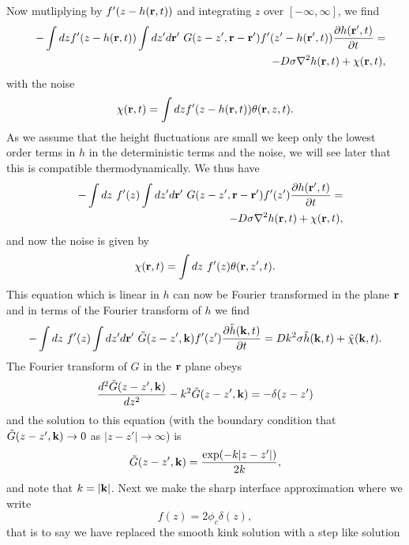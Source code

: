 \documentclass[11pt]{report}
\begin{document}
Now mutliplying by $f'(z-h({\bf r},t))$ and integrating $z$ over $[-\infty,\infty]$, we find
\begin{eqnarray}
&&-\int dz f'(z-h({\bf r},t))\int dz'd{\bf r}'\  G(z-z',{\bf r}-{\bf r}') f'(z'-h({\bf r}',t))\frac{\partial h({\bf r}',t)}{\partial t} = \\
&&-D\sigma \nabla^2 h({\bf r},t) + \chi({\bf r},t),
\end{eqnarray}
with the noise
\begin{equation}
\chi({\bf r},t)= \int dz f'(z-h({\bf r},t)) \theta({\bf r},z,t).
\end{equation}
As we assume that the height fluctuations are small we keep only the lowest order terms in $h$ in the deterministic terms and the noise, we will see later that this is compatible thermodynamically. We thus have
\begin{eqnarray}
&&-\int dz \ f'(z)\int dz'd{\bf r}'\  G(z-z',{\bf r}-{\bf r}') f'(z')\frac{\partial h({\bf r}',t)}{\partial t} = \\
&&-D\sigma \nabla^2 h({\bf r},t) + \chi({\bf r},t),
\end{eqnarray}
and now  the noise is given by
\begin{equation}
\chi({\bf r},t)= \int dz\  f'(z) \theta({\bf r},z',t).
\end{equation}
This equation which is linear in $h$ can now be Fourier transformed in the plane ${\bf r}$ and in terms of the Fourier transform of $h$ we find
\begin{equation}
-\int dz \ f'(z)\int dz'd{\bf r}'\ \tilde G(z-z',{\bf k}) f'(z')\frac{\partial\tilde h({\bf k},t)}{\partial t} = 
Dk^2\sigma \tilde h({\bf k},t) + \tilde \chi({\bf k},t).\label{bstep}
\end{equation}
The Fourier transform of $G$ in the ${\bf r}$ plane obeys
\begin{equation}
\frac{d^2 \tilde G(z-z',{\bf k} )}{dz^2}-k^2 \tilde G(z-z',{\bf k} )=-\delta(z-z')
\end{equation}
and the solution to this equation (with the boundary condition that $\tilde G(z-z',{\bf k} )\to 0$ as $|z-z'|\to\infty$)  is
\begin{equation}
\tilde G(z-z',{\bf k}) = \frac{\exp(-k|z-z'|)}{2k},
\end{equation}
and note that $k=|{\bf k}|$. 
Next we make the sharp interface approximation where we write
\begin{equation}
f(z) = 2\phi_c \delta(z),\label{sharp}
\end{equation}
that is to say we have replaced the smooth kink solution with a step like solution
\end{document}
